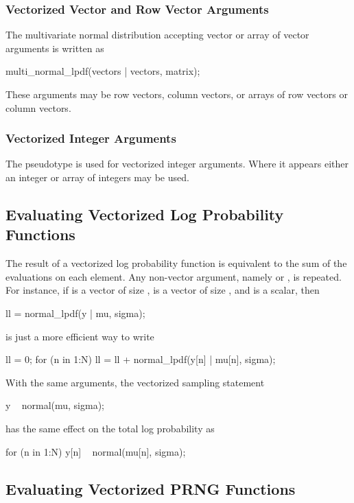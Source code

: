 \subsubsection{Vectorized Vector and Row Vector Arguments}

The multivariate normal distribution accepting vector or array of
vector arguments is written as
%
\begin{stancode}
multi_normal_lpdf(vectors | vectors, matrix);
\end{stancode}
%
These arguments may be row vectors, column vectors, or arrays of row
vectors or column vectors.

\subsubsection{Vectorized Integer Arguments}

The pseudotype  is used for vectorized integer arguments.
Where it appears either an integer or array of integers may be used.


\subsection{Evaluating Vectorized Log Probability Functions}

The result of a vectorized log probability function is equivalent to
the sum of the evaluations on each element.  Any non-vector argument,
namely  or , is repeated.  For instance, if
 is a vector of size ,  is a vector of size
, and  is a scalar, then
%
\begin{stancode}
ll = normal_lpdf(y | mu, sigma);
\end{stancode}
%
is just a more efficient way to write
%
\begin{stancode}
ll = 0;
for (n in 1:N)
  ll = ll + normal_lpdf(y[n] | mu[n], sigma);
\end{stancode}
%
With the same arguments, the vectorized sampling statement
%
\begin{stancode}
y ~ normal(mu, sigma);
\end{stancode}
%
has the same effect on the total log probability as
%
\begin{stancode}
for (n in 1:N)
  y[n] ~ normal(mu[n], sigma);
\end{stancode}

\subsection{Evaluating Vectorized PRNG Functions}\label{prng-vectorization.section}

